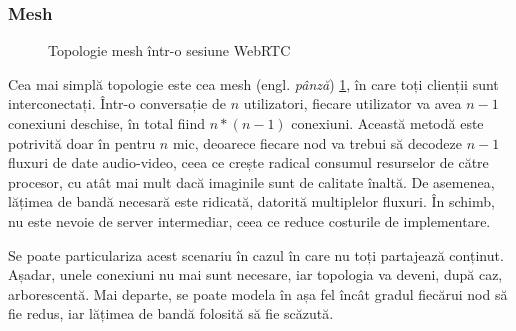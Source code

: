 \subsubsection{Mesh}
\label{sec:ch3sec1subsec2subsubsec1}
\begin{figure}[H]
    \centering
    \scalebox{0.65}{}
    \caption{Topologie mesh într-o sesiune WebRTC}
    \label{WebRTCMesh}
\end{figure}
\indent \par Cea mai simplă topologie este cea mesh (engl. \textit{pânză}) \ref{WebRTCMesh}, în care toți clienții sunt interconectați. Într-o conversație de \(n\) utilizatori, fiecare utilizator va avea \(n-1\) conexiuni deschise, în total fiind \(n*(n-1)\) conexiuni. Această metodă este potrivită doar în pentru \(n\) mic, deoarece fiecare nod va trebui să decodeze \(n-1\) fluxuri de date audio-video, ceea ce crește radical consumul resurselor de către procesor, cu atât mai mult dacă imaginile sunt de calitate înaltă. De asemenea, lățimea de bandă necesară este ridicată, datorită multiplelor fluxuri. În schimb, nu este nevoie de server intermediar, ceea ce reduce costurile de implementare.
\indent \par Se poate particulariza acest scenariu în cazul în care nu toți partajează conținut. Așadar, unele conexiuni nu mai sunt necesare, iar topologia va deveni, după caz, arborescentă. Mai departe, se poate modela în așa fel încât gradul fiecărui nod să fie redus, iar lățimea de bandă folosită să fie scăzută.

